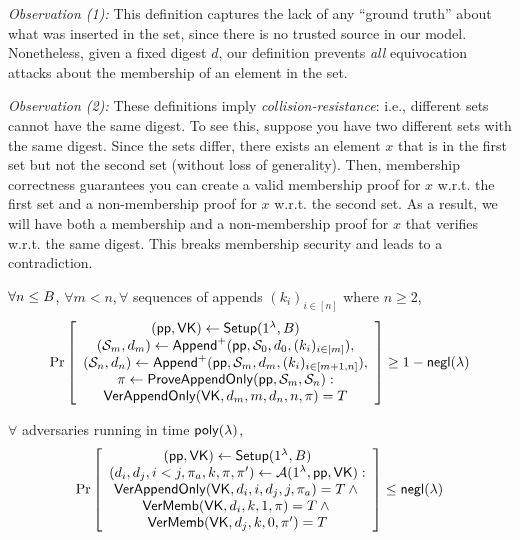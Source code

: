 \noindent \textit{Observation (1):}
This definition captures the lack of any ``ground truth'' about what was inserted in the set, since there is no trusted source in our model.
Nonetheless, given a fixed digest $d$, our definition prevents \textit{all} equivocation attacks about the membership of an element in the set.

\noindent \textit{Observation (2):}
These definitions imply \textit{collision-resistance}: i.e., different sets cannot have the same digest.
To see this, suppose you have two different sets with the same digest.
Since the sets differ, there exists an element $x$ that is in the first set but not the second set (without loss of generality).
Then, membership correctness guarantees you can create a valid membership proof for $x$ w.r.t. the first set and a non-membership proof for $x$ w.r.t. the second set.
As a result, we will have both a membership and a non-membership proof for $x$ that verifies w.r.t. the same digest.
This breaks membership security and leads to a contradiction.


\begin{definition}
\label{def:aas:appendonly-correctness}
$\forall n \le B$, $\forall m < n,\forall$ sequences of appends $(k_i)_{i\in[n]}$ where $n\ge2$,
\begin{align*}
\Pr \left[ \begin{array}{c}
(\mathsf{pp},\mathsf{VK}) \leftarrow \mathsf{Setup}(1^\lambda, B) \\
(\mathcal{S}_m, d_m) \leftarrow \mathsf{Append}^{+}(\mathsf{pp},\mathcal{S}_0,d_0,(k_i)_{i\in[m]}),\\
(\mathcal{S}_n, d_n) \leftarrow \mathsf{Append}^{+}(\mathsf{pp},\mathcal{S}_m,d_m,(k_i)_{i\in[m+1,n]}),  \\
\pi \leftarrow \mathsf{ProveAppendOnly}(\mathsf{pp},\mathcal{S}_m, \mathcal{S}_n):\\
{\mathsf{VerAppendOnly}(\mathsf{VK}, d_m, m, d_n, n, \pi) = T}
\end{array} \right] \ge 1 - \mathsf{negl}(\lambda)
\end{align*}
\end{definition}

\begin{definition}
\label{def:aas:appendonly-security}
$\forall$ adversaries \Adv running in time $\mathsf{poly}(\lambda)$,
\begin{align*}
\Pr \left[ \begin{array}{c}
(\mathsf{pp},\mathsf{VK}) \leftarrow \mathsf{Setup}(1^\lambda, B)\\
(d_i,d_j,i < j,\pi_a, k,\pi,\pi') \leftarrow \mathcal{A}(1^\lambda, \mathsf{pp}, \mathsf{VK})
: \\
{\mathsf{VerAppendOnly}(\mathsf{VK}, d_i, i, d_j, j, \pi_a) = T} \wedge {}\\
{\mathsf{VerMemb}(\mathsf{VK}, d_i, k, 1, \pi )  = T} \wedge {}\\
{\mathsf{VerMemb}(\mathsf{VK}, d_j, k, 0, \pi') = T}
\end{array} \right] \le \mathsf{negl}(\lambda)
\end{align*}
\end{definition}

